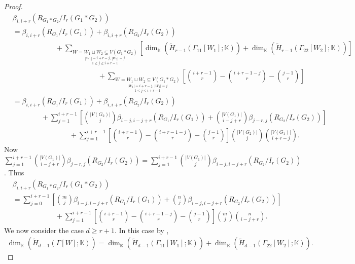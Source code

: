 \documentclass[12pt,reqno]{amsart}
\theoremstyle{definition}
\newcommand{\K}{\mathbb K}
\begin{document}
\begin{proof}
       {\footnotesize
    \begin{align*}
    &\beta_{i,i+r}(R_{G_1*G_2}/I_r(G_1*G_2))\\
       &=\beta_{i,i+r}(R_{G_1}/I_r(G_1))+\beta_{i,i+r}(R_{G_2}/I_r(G_2))\\
       &\hspace{6em}+\sum_{\underset{1\le j\le i+r-1}{\underset{|W_1|=i+r-j,\,|W_2|=j}{W=W_1\sqcup W_2 \subseteq V(G_1*G_2) }}}\left[\dim_{\K}(\widetilde H_{r-1}(\Gamma_{11}[W_1];\K))+\dim_{\K}(\widetilde H_{r-1}(\Gamma_{22}[W_2];\K))\right]\\
       &\hspace{12em}+\sum_{\underset{1\le j\le i+r-1}{\underset{|W_1|=i+r-j,\,|W_2|=j}{W=W_1\sqcup W_2 \subseteq V(G_1*G_2) }}}\left[{i+r-1\choose r}-{i+r-1-j\choose r}-{j-1\choose r}\right]\\
       &=\beta_{i,i+r}(R_{G_1}/I_r(G_1))+\beta_{i,i+r}(R_{G_2}/I_r(G_2))\\
       &\hspace{4em}+\sum_{j=1}^{i+r-1}\left[ {|V(G_2)|\choose j}\beta_{i-j,i-j+r}(R_{G_1}/I_r(G_1))+{|V(G_1)|\choose i-j+r}\beta_{j-r,j}(R_{G_2}/I_r(G_2)) \right]\\
       &\hspace{8em}+\sum_{j=1}^{i+r-1}\left[{i+r-1\choose r}-{i+r-1-j\choose r}-{j-1\choose r}\right]{|V(G_2)|\choose j}{|V(G_1)|\choose i+r-j}.
    \end{align*}}
    \noindent
    Now $\sum_{j=1}^{i+r-1}{|V(G_1)|\choose i-j+r}\beta_{j-r,j}(R_{G_2}/I_r(G_2))=\sum_{j=1}^{i+r-1}{|V(G_1)|\choose j}\beta_{i-j,i-j+r}(R_{G_2}/I_r(G_2))$. Thus
    {\footnotesize
    \begin{align*}
        &\beta_{i,i+r}(R_{G_1*G_2}/I_r(G_1*G_2))\\
        &=\sum_{j=0}^{i+r-1}\left[ {m\choose j}\beta_{i-j,i-j+r}(R_{G_1}/I_r(G_1))+{n\choose j}\beta_{i-j,i-j+r}(R_{G_2}/I_r(G_2)) \right]\\
       &\hspace{6em}+\sum_{j=1}^{i+r-1}\left[{i+r-1\choose r}-{i+r-1-j\choose r}-{j-1\choose r}\right]{m\choose j}{n\choose i-j+r}.
    \end{align*}}
    \noindent
    We now consider the case $d\ge r+1$. In this case by ,
    {\footnotesize
    \begin{align*}
     \dim_{\K}(\widetilde H_{d-1}(\Gamma[W];\K))=\dim_{\K}(\widetilde H_{d-1}(\Gamma_{11}[W_1];\K))+\dim_{\K}(\widetilde H_{d-1}(\Gamma_{22}[W_2];\K)).
    \end{align*}}

\end{proof}
\end{document}
